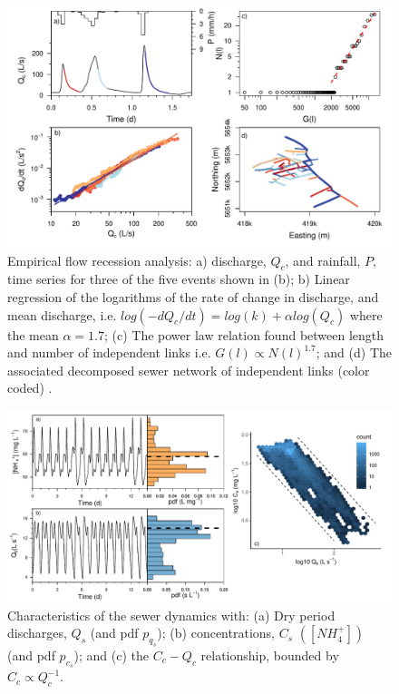\documentclass[draft,linenumbers]{agujournal2018}
\begin{document}
   \begin{figure}[ht]
 \centering
\includegraphics[width=30pc]{Fig4.pdf}
 \caption{Empirical f\/low recession analysis: a) discharge, $Q_c$, and rainfall, $P$, time series for three of the f\/ive events shown in (b); b) Linear regression of the logarithms of the rate of change in discharge, and mean discharge, i.e. $log(-dQ_c/dt) = log(k) +  \alpha log(Q_c)$ where the mean $\alpha = 1.7$; (c) The power law relation found between length and number of independent links i.e. $G(l) \propto N(l)^{1.7}$; and (d) The associated decomposed sewer network of independent links (color coded)  \citet{Biswal_2014}.}
 \label{figthree}
  \end{figure}
  
 \begin{figure}[ht]
 \centering
\includegraphics[width=30pc]{Fig3.pdf}
\caption{Characteristics of the sewer dynamics with: (a) Dry period discharges, $Q_s$ (and pdf $p_{q_s}$); (b) concentrations, $C_s$ $([NH_4^+])$ (and pdf $p_{c_s}$); and (c) the $C_c-Q_c$ relationship, bounded by $C_c \propto Q_c^{-1}$.}
 \label{figfour}
 \end{figure}
\end{document}
